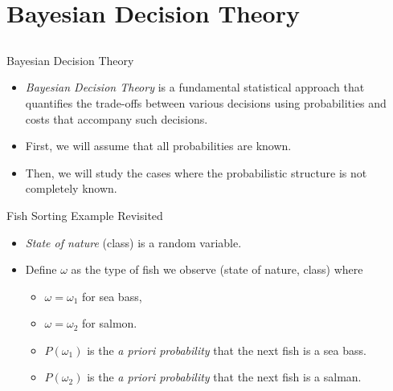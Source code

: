 \section{Bayesian Decision Theory}
\subsection{}

\begin{frame}{Bayesian Decision Theory}
\begin{itemize}
\setlength{\itemsep}{8pt}
\item \textit{\color{mycolor1}Bayesian Decision Theory} is a fundamental statistical
approach that quantifies the trade-offs between various
decisions using probabilities and costs that accompany
such decisions.\nocite{duda2012pattern}
\item First, we will assume that all probabilities are known.
\item Then, we will study the cases where the probabilistic
structure is not completely known.
\end{itemize}
\end{frame}

\begin{frame}{Fish Sorting Example Revisited}
\begin{itemize}
\item \textit{\color{mycolor1}State of nature} (class) is a random variable.
\item Define $\omega$ as the type of fish we observe (state of nature, class) where
\begin{itemize}
\item $\omega=\omega_1$ for sea bass,
\item $\omega=\omega_2$ for salmon.
\item $P(\omega_1)$ is the \textit{\color{mycolor1}a priori probability} that the next fish is a sea bass.
\item $P(\omega_2)$ is the \textit{a priori probability} that the next fish is a salman.
\end{itemize}
\end{itemize}
\end{frame}


